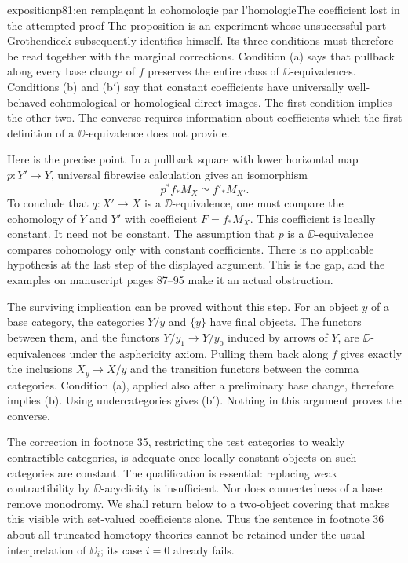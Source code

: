 \begin{dcomment}{exposition}{p81:en remplaçant la cohomologie par l'homologie}{The coefficient lost in the attempted proof}
The proposition is an experiment whose unsuccessful part Grothendieck subsequently identifies himself. Its three conditions must therefore be read together with the marginal corrections. Condition (a) says that pullback along every base change of $f$ preserves the entire class of $\DD$-equivalences. Conditions (b) and (b$'$) say that constant coefficients have universally well-behaved cohomological or homological direct images. The first condition implies the other two. The converse requires information about coefficients which the first definition of a $\DD$-equivalence does not provide.

Here is the precise point. In a pullback square with lower horizontal map $p:Y'\to Y$, universal fibrewise calculation gives an isomorphism
\[
 p^*f_*M_X\simeq f'_*M_{X'}.
\]
To conclude that $q:X'\to X$ is a $\DD$-equivalence, one must compare the cohomology of $Y$ and $Y'$ with coefficient $F=f_*M_X$. This coefficient is locally constant. It need not be constant. The assumption that $p$ is a $\DD$-equivalence compares cohomology only with constant coefficients. There is no applicable hypothesis at the last step of the displayed argument. This is the gap, and the examples on manuscript pages 87--95 make it an actual obstruction.

The surviving implication can be proved without this step. For an object $y$ of a base category, the categories $Y/y$ and $\{y\}$ have final objects. The functors between them, and the functors $Y/y_1\to Y/y_0$ induced by arrows of $Y$, are $\DD$-equivalences under the asphericity axiom. Pulling them back along $f$ gives exactly the inclusions $X_y\to X/y$ and the transition functors between the comma categories. Condition (a), applied also after a preliminary base change, therefore implies (b). Using undercategories gives (b$'$). Nothing in this argument proves the converse.

The correction in footnote 35, restricting the test categories to weakly contractible categories, is adequate once locally constant objects on such categories are constant. The qualification is essential: replacing weak contractibility by $\DD$-acyclicity is insufficient. Nor does connectedness of a base remove monodromy. We shall return below to a two-object covering that makes this visible with set-valued coefficients alone. Thus the sentence in footnote 36 about all truncated homotopy theories cannot be retained under the usual interpretation of $\DD_i$; its case $i=0$ already fails.
\end{dcomment}


